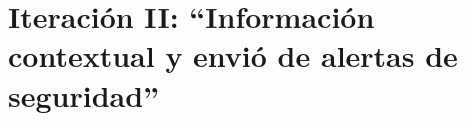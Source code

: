 \chapter{Iteración II: “Información contextual y envió de alertas de seguridad”}

\label{iteracion2}
